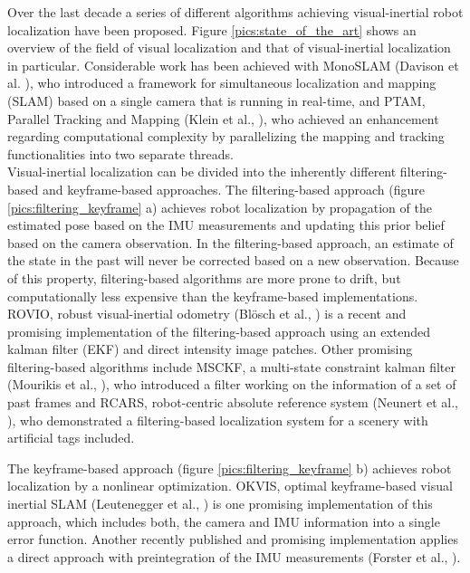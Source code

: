 Over the last decade a series of different algorithms achieving visual-inertial robot localization have been proposed. Figure \ref{pics:state_of_the_art} shows an overview of the field of visual localization and that of visual-inertial localization in particular. Considerable work has been achieved with MonoSLAM (Davison et al. \cite{davison2007monoslam}), who introduced a framework for simultaneous localization and mapping (SLAM) based on a single camera that is running in real-time, and PTAM, Parallel Tracking and Mapping (Klein et al., \cite{klein2007parallel}), who achieved an enhancement regarding computational complexity by parallelizing the mapping and tracking functionalities into two separate threads. \\

Visual-inertial localization can be divided into the inherently different filtering-based and keyframe-based approaches. The filtering-based approach (figure \ref{pics:filtering_keyframe} a) achieves robot localization by propagation of the estimated pose based on the IMU measurements and updating this prior belief based on the camera observation. In the filtering-based approach, an estimate of the state in the past will never be corrected based on a new observation. Because of this property, filtering-based algorithms are more prone to drift, but computationally less expensive than the keyframe-based implementations. ROVIO, robust visual-inertial odometry (Blösch et al., \cite{bloeschrobust}) is a recent and promising implementation of the filtering-based approach using an extended kalman filter (EKF) and direct intensity image patches. Other promising filtering-based algorithms include MSCKF, a multi-state constraint kalman filter (Mourikis et al., \cite{mourikis2007multi}), who introduced a filter working on the information of a set of past frames and RCARS, robot-centric absolute reference system (Neunert et al., \cite{neunert2015open}), who demonstrated a filtering-based localization system for a scenery with artificial tags included.

The keyframe-based approach (figure \ref{pics:filtering_keyframe} b) achieves robot localization by a nonlinear optimization. OKVIS, optimal keyframe-based visual inertial SLAM (Leutenegger et al., \cite{leutenegger2015keyframe}) is one promising implementation of this approach, which includes both, the camera and IMU information into a single error function. Another recently published and promising implementation applies a direct approach with preintegration of the IMU measurements (Forster et al., \cite{forster2015imu}).

